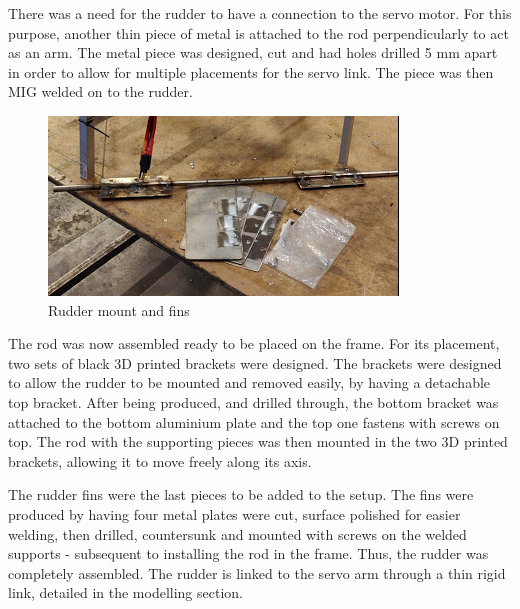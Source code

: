 There was a need for the rudder to have a connection to the servo motor. For this purpose, another thin piece of metal is attached to the rod perpendicularly to act as an arm. 
The metal piece was designed, cut and had holes drilled 5 mm apart in order to allow for multiple placements for the servo link. The piece was then MIG welded on to the rudder. 

\begin{figure}[h!]
    \centering
    \includegraphics[scale=1.1]{graphics/Drone/RudderPieces.png}
    \caption{Rudder mount and fins}
     \label{fig:Rudder mount and fins}
\end{figure} 


The rod was now assembled ready to be placed on the frame. 
For its placement, two sets of black 3D printed brackets were designed. The brackets were designed to allow the rudder to be mounted and removed easily, by having a detachable top bracket. 
After being produced, and drilled through, the bottom bracket was attached to the bottom aluminium plate and the top one fastens with screws on top.  
The rod with the supporting pieces was then mounted in the two 3D printed brackets, allowing it to move freely along its axis. 
 
The rudder fins were the last pieces to be added to the setup. The fins were produced by having four metal plates were cut, surface polished for easier welding, then drilled, countersunk and mounted with screws on the welded supports - subsequent to installing the rod in the frame. 
Thus, the rudder was completely assembled. The rudder is linked to the servo arm through a thin rigid link, detailed in the modelling section. 


